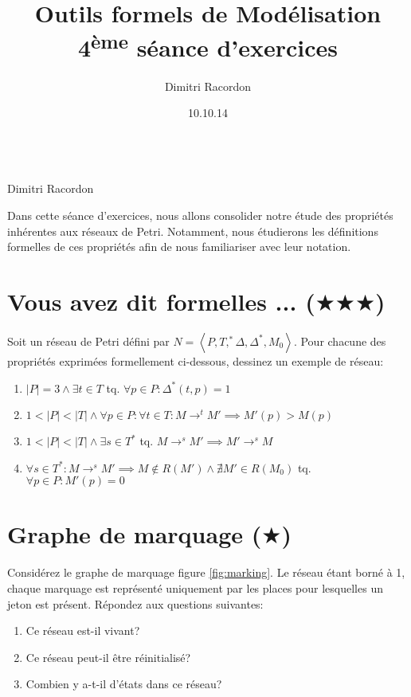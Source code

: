 \documentclass[a4paper, titlepage]{article}
\makeatletter
\numberwithin{figure}{section}
\numberwithin{table}{section}
\newcommand{\tuple}[1]{\ensuremath{\left \langle #1 \right \rangle }}
\newcommand{\card}[1]{\ensuremath{\left \vert #1 \right \vert }}
\newcommand\objective[1]{\def\@objective{#1}}
\newcommand{\makecustomtitle}{%
	\begin{center}
		\huge\@title \\
		[1ex]\small Dimitri Racordon \\ \@date
	\end{center}
	\@objective
}
\makeatother
\begin{document}
  \title{Outils formels de Modélisation \\ 4\textsuperscript{ème} séance d'exercices}
  \author{Dimitri Racordon}
  \date{10.10.14}
	\objective{Dans cette séance d'exercices, nous allons consolider notre étude des propriétés inhérentes aux réseaux de Petri. Notamment, nous étudierons les définitions formelles de ces propriétés afin de nous familiariser avec leur notation.}

	\makecustomtitle

\section{Vous avez dit formelles ... ($\bigstar\bigstar\bigstar$)}

Soit un réseau de Petri défini par $N=\tuple{P,T,^*\Delta,\Delta^*,M_0}$.
Pour chacune des propriétés exprimées formellement ci-dessous, dessinez un exemple de réseau:
\begin{enumerate}
	\item $|P|=3 \wedge \exists t \in T$ tq. $\forall p \in P: \Delta^*(t,p) = 1$
	\item $1 < \card{P} < \card{T} \wedge \forall p \in P: \forall t \in T: M \rightarrow^t M' \implies M'(p) > M(p)$
  \item $1 < \card{P} < \card{T} \wedge \exists s \in T^*$ tq. $M \rightarrow^s M' \implies M' \rightarrow^s M$
  \item $\forall s \in T^*: M \rightarrow^s M' \implies M \notin R(M') \wedge \nexists M' \in R(M_0)$ tq. $\forall p \in P: M'(p) = 0$
\end{enumerate}

\section{Graphe de marquage ($\bigstar$)}

Considérez le graphe de marquage figure \ref{fig:marking}.
Le réseau étant borné à 1,
chaque marquage est représenté uniquement par les places pour lesquelles un jeton est présent.
Répondez aux questions suivantes:
\begin{enumerate}
	\item Ce réseau est-il vivant?
	\item Ce réseau peut-il être réinitialisé?
	\item Combien y a-t-il d'états dans ce réseau?
\end{enumerate}
\end{document}
